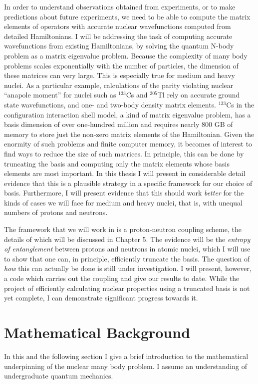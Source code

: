 In order to understand observations obtained 
from experiments, or to make predictions about future experiments, we need to be 
able to compute the matrix elements of operators with accurate nuclear 
wavefunctions computed from detailed Hamiltonians.
I will be addressing the task of computing accurate wavefunctions from existing
Hamiltonians, by solving the quantum N-body problem as a matrix
eigenvalue problem. Because the complexity of many body problems scales exponentially
with the number of particles, the dimension of these matrices can very large. This is
especially true for medium and heavy nuclei. As a particular
example, calculations of the parity violating nuclear ``anapole moment'' for nuclei such as $^{133}$Cs and 
$^{205}$Tl rely on accurate ground state wavefunctions, and one- and two-body 
density matrix elements\cite{Haxton89,Haxton02}. $^{133}$Cs in the configuration interaction shell model,
a kind of matrix eigenvalue problem, has a basis dimension 
of over one-hundred million and requires nearly $800$ GB of memory to store
just the non-zero matrix elements of the Hamiltonian. Given the enormity of 
such problems and finite computer memory, it becomes of interest 
to find ways to reduce the size of such matrices. In principle, this can be done by truncating
the basis and computing only the matrix elements whose basis elements are most important.
In this thesis I will present in considerable detail evidence that this is a plausible
strategy in a specific framework for our choice of basis. Furthermore, I will present evidence that 
this should work \textit{better} for the kinds of cases we will face for medium
and heavy nuclei, that is, with unequal numbers of protons and neutrons.

The framework that we will work in is a proton-neutron coupling scheme, the details of 
which will be discussed in Chapter 5. The evidence will be the \textit{entropy of entanglement}
between protons and neutrons in atomic nuclei, which I will use to show that one can, in principle, efficiently
truncate the basis. The question of \textit{how} this can actually be done is still
under investigation. I will present, however, a code which carries out the 
coupling and give our results to date. While the project of efficiently calculating
nuclear properties using a truncated basis is not yet complete, I can
demonstrate significant progress towards it.

\section{Mathematical Background}
In this and the following section I give a brief introduction to the mathematical underpinning
of the nuclear many body problem. I assume an understanding of undergraduate quantum 
mechanics.

